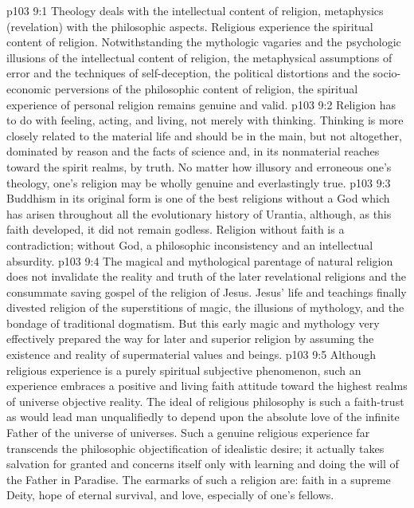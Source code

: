 \vs p103 9:1 Theology deals with the intellectual content of religion, metaphysics (revelation) with the philosophic aspects. Religious experience  the spiritual content of religion. Notwithstanding the mythologic vagaries and the psychologic illusions of the intellectual content of religion, the metaphysical assumptions of error and the techniques of self\hyp{}deception, the political distortions and the socio\hyp{}economic perversions of the philosophic content of religion, the spiritual experience of personal religion remains genuine and valid.
\vs p103 9:2 Religion has to do with feeling, acting, and living, not merely with thinking. Thinking is more closely related to the material life and should be in the main, but not altogether, dominated by reason and the facts of science and, in its nonmaterial reaches toward the spirit realms, by truth. No matter how illusory and erroneous one’s theology, one’s religion may be wholly genuine and everlastingly true.
\vs p103 9:3 Buddhism in its original form is one of the best religions without a God which has arisen throughout all the evolutionary history of Urantia, although, as this faith developed, it did not remain godless. Religion without faith is a contradiction; without God, a philosophic inconsistency and an intellectual absurdity.
\vs p103 9:4 The magical and mythological parentage of natural religion does not invalidate the reality and truth of the later revelational religions and the consummate saving gospel of the religion of Jesus. Jesus’ life and teachings finally divested religion of the superstitions of magic, the illusions of mythology, and the bondage of traditional dogmatism. But this early magic and mythology very effectively prepared the way for later and superior religion by assuming the existence and reality of supermaterial values and beings.
\vs p103 9:5 Although religious experience is a purely spiritual subjective phenomenon, such an experience embraces a positive and living faith attitude toward the highest realms of universe objective reality. The ideal of religious philosophy is such a faith\hyp{}trust as would lead man unqualifiedly to depend upon the absolute love of the infinite Father of the universe of universes. Such a genuine religious experience far transcends the philosophic objectification of idealistic desire; it actually takes salvation for granted and concerns itself only with learning and doing the will of the Father in Paradise. The earmarks of such a religion are: faith in a supreme Deity, hope of eternal survival, and love, especially of one’s fellows.
